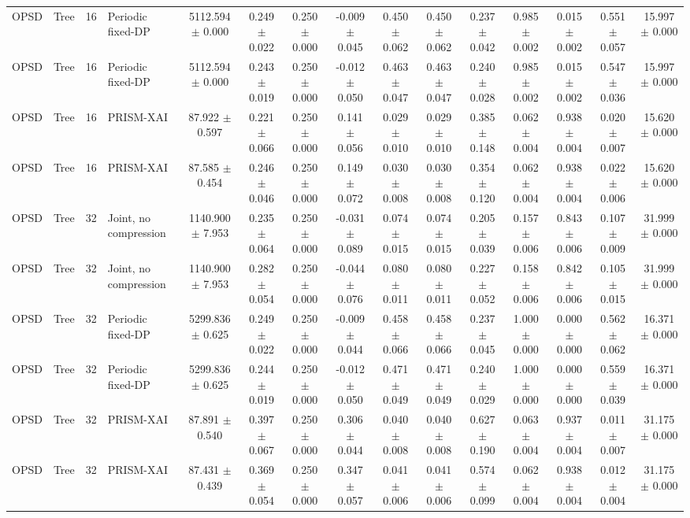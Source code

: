\begin{tabular}{llllccccccccccc}
OPSD & Tree & 16 & Periodic fixed-DP & 5112.594 $\pm$ 0.000 & 0.249 $\pm$ 0.022 & 0.250 $\pm$ 0.000 & -0.009 $\pm$ 0.045 & 0.450 $\pm$ 0.062 & 0.450 $\pm$ 0.062 & 0.237 $\pm$ 0.042 & 0.985 $\pm$ 0.002 & 0.015 $\pm$ 0.002 & 0.551 $\pm$ 0.057 & 15.997 $\pm$ 0.000 \\
OPSD & Tree & 16 & Periodic fixed-DP & 5112.594 $\pm$ 0.000 & 0.243 $\pm$ 0.019 & 0.250 $\pm$ 0.000 & -0.012 $\pm$ 0.050 & 0.463 $\pm$ 0.047 & 0.463 $\pm$ 0.047 & 0.240 $\pm$ 0.028 & 0.985 $\pm$ 0.002 & 0.015 $\pm$ 0.002 & 0.547 $\pm$ 0.036 & 15.997 $\pm$ 0.000 \\
OPSD & Tree & 16 & PRISM-XAI & 87.922 $\pm$ 0.597 & 0.221 $\pm$ 0.066 & 0.250 $\pm$ 0.000 & 0.141 $\pm$ 0.056 & 0.029 $\pm$ 0.010 & 0.029 $\pm$ 0.010 & 0.385 $\pm$ 0.148 & 0.062 $\pm$ 0.004 & 0.938 $\pm$ 0.004 & 0.020 $\pm$ 0.007 & 15.620 $\pm$ 0.000 \\
OPSD & Tree & 16 & PRISM-XAI & 87.585 $\pm$ 0.454 & 0.246 $\pm$ 0.046 & 0.250 $\pm$ 0.000 & 0.149 $\pm$ 0.072 & 0.030 $\pm$ 0.008 & 0.030 $\pm$ 0.008 & 0.354 $\pm$ 0.120 & 0.062 $\pm$ 0.004 & 0.938 $\pm$ 0.004 & 0.022 $\pm$ 0.006 & 15.620 $\pm$ 0.000 \\
OPSD & Tree & 32 & Joint, no compression & 1140.900 $\pm$ 7.953 & 0.235 $\pm$ 0.064 & 0.250 $\pm$ 0.000 & -0.031 $\pm$ 0.089 & 0.074 $\pm$ 0.015 & 0.074 $\pm$ 0.015 & 0.205 $\pm$ 0.039 & 0.157 $\pm$ 0.006 & 0.843 $\pm$ 0.006 & 0.107 $\pm$ 0.009 & 31.999 $\pm$ 0.000 \\
OPSD & Tree & 32 & Joint, no compression & 1140.900 $\pm$ 7.953 & 0.282 $\pm$ 0.054 & 0.250 $\pm$ 0.000 & -0.044 $\pm$ 0.076 & 0.080 $\pm$ 0.011 & 0.080 $\pm$ 0.011 & 0.227 $\pm$ 0.052 & 0.158 $\pm$ 0.006 & 0.842 $\pm$ 0.006 & 0.105 $\pm$ 0.015 & 31.999 $\pm$ 0.000 \\
OPSD & Tree & 32 & Periodic fixed-DP & 5299.836 $\pm$ 0.625 & 0.249 $\pm$ 0.022 & 0.250 $\pm$ 0.000 & -0.009 $\pm$ 0.044 & 0.458 $\pm$ 0.066 & 0.458 $\pm$ 0.066 & 0.237 $\pm$ 0.045 & 1.000 $\pm$ 0.000 & 0.000 $\pm$ 0.000 & 0.562 $\pm$ 0.062 & 16.371 $\pm$ 0.000 \\
OPSD & Tree & 32 & Periodic fixed-DP & 5299.836 $\pm$ 0.625 & 0.244 $\pm$ 0.019 & 0.250 $\pm$ 0.000 & -0.012 $\pm$ 0.050 & 0.471 $\pm$ 0.049 & 0.471 $\pm$ 0.049 & 0.240 $\pm$ 0.029 & 1.000 $\pm$ 0.000 & 0.000 $\pm$ 0.000 & 0.559 $\pm$ 0.039 & 16.371 $\pm$ 0.000 \\
OPSD & Tree & 32 & PRISM-XAI & 87.891 $\pm$ 0.540 & 0.397 $\pm$ 0.067 & 0.250 $\pm$ 0.000 & 0.306 $\pm$ 0.044 & 0.040 $\pm$ 0.008 & 0.040 $\pm$ 0.008 & 0.627 $\pm$ 0.190 & 0.063 $\pm$ 0.004 & 0.937 $\pm$ 0.004 & 0.011 $\pm$ 0.007 & 31.175 $\pm$ 0.000 \\
OPSD & Tree & 32 & PRISM-XAI & 87.431 $\pm$ 0.439 & 0.369 $\pm$ 0.054 & 0.250 $\pm$ 0.000 & 0.347 $\pm$ 0.057 & 0.041 $\pm$ 0.006 & 0.041 $\pm$ 0.006 & 0.574 $\pm$ 0.099 & 0.062 $\pm$ 0.004 & 0.938 $\pm$ 0.004 & 0.012 $\pm$ 0.004 & 31.175 $\pm$ 0.000 \\
\bottomrule
\end{tabular}
